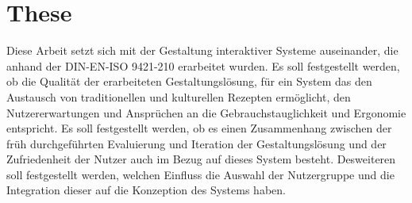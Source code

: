\section{These}
Diese Arbeit setzt sich mit der Gestaltung interaktiver Systeme auseinander, die anhand der DIN-EN-ISO 9421-210 \citep{DINISO_2010} erarbeitet wurden. Es soll festgestellt werden, ob die Qualität der erarbeiteten Gestaltungslösung, für ein System das den Austausch von traditionellen und kulturellen Rezepten ermöglicht, den Nutzererwartungen und Ansprüchen an die Gebrauchstauglichkeit und Ergonomie entspricht.
Es soll festgestellt werden, ob es einen Zusammenhang zwischen der früh durchgeführten Evaluierung und Iteration der Gestaltungslösung und der Zufriedenheit der Nutzer auch im Bezug auf dieses System besteht.
Desweiteren soll festgestellt werden, welchen Einfluss die Auswahl der Nutzergruppe und die Integration dieser auf die Konzeption des Systems haben.
